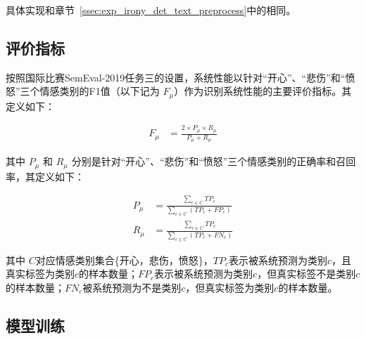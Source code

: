 具体实现和章节~\ref{ssec:exp_irony_det_text_preprocess}中的相同。

\subsection{评价指标}
\label{ssec:exp_context_emo_eval_metric}

按照国际比赛SemEval-2019任务三的设置，系统性能以针对“开心”、“悲伤”和“愤怒”三个情感类别的F1值（以下记为 $F_\mu$）作为识别系统性能的主要评价指标。其定义如下：

\begin{align}
  F_\mu &= \frac{2 \times P_\mu \times R_\mu}{P_\mu + R_\mu}
\end{align}

其中 $P_\mu$ 和 $R_\mu$ 分别是针对“开心”、“悲伤”和“愤怒”三个情感类别的正确率和召回率，其定义如下：

\begin{align}
  P_\mu &= \frac{\sum\limits_{c \in C} TP_c}{\sum\limits_{c \in C}(TP_c + FP_c)} \\
  R_\mu &= \frac{\sum\limits_{c \in C} TP_c}{\sum\limits_{c \in C}(TP_c + FN_c)}
\end{align}

其中 $C$对应情感类别集合\{开心，悲伤，愤怒\}，$TP_c$表示被系统预测为类别$c$，且真实标签为类别$c$的样本数量；$FP_c$表示被系统预测为类别$c$，但真实标签不是类别$c$的样本数量；$FN_c$被系统预测为不是类别$c$，但真实标签为类别$c$的样本数量。 






\subsection{模型训练}
\label{ssec:exp_context_emo_model_training}

